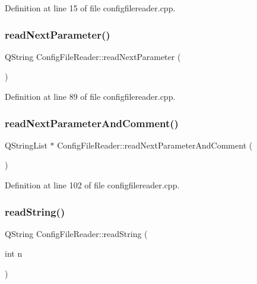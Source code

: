 Definition at line 15 of file configfilereader.\+cpp.

\mbox{\label{class_config_file_reader_a3dc4554eb1461c95007543e1a902dc9a}} 
\subsubsection{\texorpdfstring{readNextParameter()}{readNextParameter()}}
{\footnotesize\ttfamily Q\+String Config\+File\+Reader\+::read\+Next\+Parameter (\begin{DoxyParamCaption}{ }\end{DoxyParamCaption})}



Definition at line 89 of file configfilereader.\+cpp.

\mbox{\label{class_config_file_reader_a5be7958f2247246009450ab0f1db5f52}} 
\subsubsection{\texorpdfstring{readNextParameterAndComment()}{readNextParameterAndComment()}}
{\footnotesize\ttfamily Q\+String\+List $\ast$ Config\+File\+Reader\+::read\+Next\+Parameter\+And\+Comment (\begin{DoxyParamCaption}{ }\end{DoxyParamCaption})}



Definition at line 102 of file configfilereader.\+cpp.

\mbox{\label{class_config_file_reader_a0cdc9e9df26b9ecbb3d7f57fa8c65fc8}} 
\subsubsection{\texorpdfstring{readString()}{readString()}}
{\footnotesize\ttfamily Q\+String Config\+File\+Reader\+::read\+String (\begin{DoxyParamCaption}\item[{int}]{n }\end{DoxyParamCaption})}



